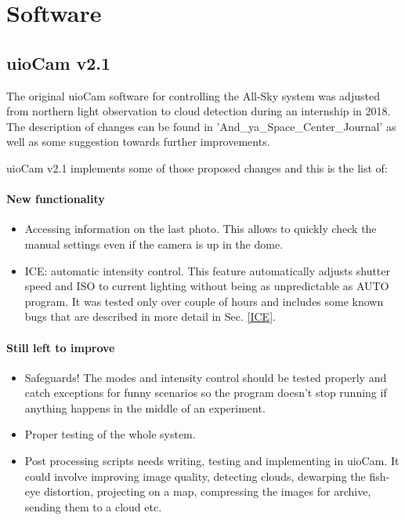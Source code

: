 \documentclass[]{book}
\begin{document}
	\section{Software}
	
	\subsection{uioCam v2.1}
	
	The original uioCam software for controlling the All-Sky system was adjusted from northern light observation to cloud detection during an internship in 2018. The description of changes can be found in 'And\_ya\_Space\_Center\_Journal' as well as some suggestion towards further improvements.
	
	uioCam v2.1 implements some of those proposed changes and this is the list of:
	
	\paragraph{New functionality}
	\begin{itemize}
		\item Accessing information on the last photo. This allows to quickly check the manual settings even if the camera is up in the dome.
		\item ICE: automatic intensity control. This feature automatically adjusts shutter speed and ISO to current lighting without being as unpredictable as AUTO program. It was tested only over couple of hours and includes some known bugs that are described in more detail in Sec. \ref{ICE}.
	\end{itemize}

	\paragraph{Still left to improve}
	\begin{itemize}
		\item Safeguards! The modes and intensity control should be tested properly and catch exceptions for funny scenarios so the program doesn’t stop running if anything happens in the middle of an experiment.
		\item Proper testing of the whole system.
		\item Post processing scripts needs writing, testing and implementing in uioCam. It could involve improving image quality, detecting clouds, dewarping the fish-eye distortion, projecting on a map, compressing the images for archive, sending them to a cloud etc.
	\end{itemize}
\end{document}
